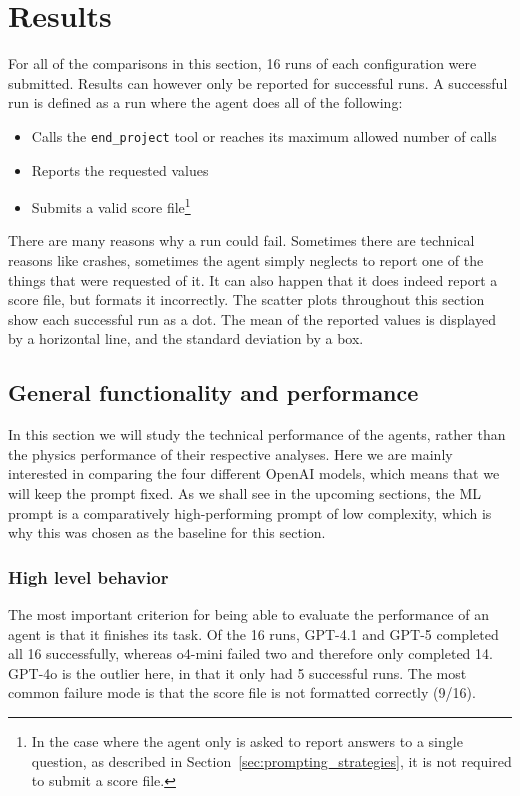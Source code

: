 \documentclass[submission, Phys]{SciPost}
\begin{document}

\section{Results}
\label{sec:results}
For all of the comparisons in this section, 16 runs of each configuration were submitted. Results can however only be reported for successful runs. A successful run is defined as a run where the agent does all of the following:
\begin{itemize}
    \item Calls the \verb|end_project| tool or reaches its maximum allowed number of calls
    \item Reports the requested values
    \item Submits a valid score file\footnote{In the case where the agent only is asked to report answers to a single question, as described in Section~\ref{sec:prompting_strategies}, it is not required to submit a score file.}
\end{itemize}
There are many reasons why a run could fail. Sometimes there are technical reasons like crashes, sometimes the agent simply neglects to report one of the things that were requested of it. It can also happen that it does indeed report a score file, but formats it incorrectly. The scatter plots throughout this section show each successful run as a dot. The mean of the reported values is displayed by a horizontal line, and the standard deviation by a box. 

\subsection{General functionality and performance}
In this section we will study the technical performance of the agents, rather than the physics performance of their respective analyses. Here we are mainly interested in comparing the four different OpenAI models, which means that we will keep the prompt fixed. As we shall see in the upcoming sections, the ML prompt is a comparatively high-performing prompt of low complexity, which is why this was chosen as the baseline for this section. 

\subsubsection{High level behavior}
\label{sec:high_level_behavior}
The most important criterion for being able to evaluate the performance of an agent is that it finishes its task. Of the 16 runs, GPT-4.1 and GPT-5 completed all 16 successfully, whereas o4-mini failed two and therefore only completed 14. GPT-4o is the outlier here, in that it only had 5 successful runs. The most common failure mode is that the score file is not formatted correctly (9/16).
\end{document}
